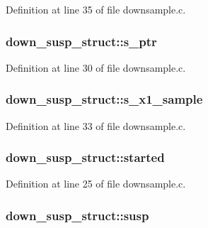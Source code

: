 Definition at line 35 of file downsample.\+c.

\subsubsection[{\texorpdfstring{s\+\_\+ptr}{s_ptr}}]{ down\+\_\+susp\+\_\+struct\+::s\+\_\+ptr}\hypertarget{structdown__susp__struct_aa2fe1a57319312513af4895857b41798}{}\label{structdown__susp__struct_aa2fe1a57319312513af4895857b41798}


Definition at line 30 of file downsample.\+c.

\subsubsection[{\texorpdfstring{s\+\_\+x1\+\_\+sample}{s_x1_sample}}]{ down\+\_\+susp\+\_\+struct\+::s\+\_\+x1\+\_\+sample}\hypertarget{structdown__susp__struct_a4c337ccadec812e7ca4329eea901250c}{}\label{structdown__susp__struct_a4c337ccadec812e7ca4329eea901250c}


Definition at line 33 of file downsample.\+c.

\subsubsection[{\texorpdfstring{started}{started}}]{ down\+\_\+susp\+\_\+struct\+::started}\hypertarget{structdown__susp__struct_ab03fc127790f215ff5249c3ecc013d85}{}\label{structdown__susp__struct_ab03fc127790f215ff5249c3ecc013d85}


Definition at line 25 of file downsample.\+c.

\subsubsection[{\texorpdfstring{susp}{susp}}]{ down\+\_\+susp\+\_\+struct\+::susp}\hypertarget{structdown__susp__struct_a923a2ed178e5d5a651c53373b6e15f78}{}\label{structdown__susp__struct_a923a2ed178e5d5a651c53373b6e15f78}



